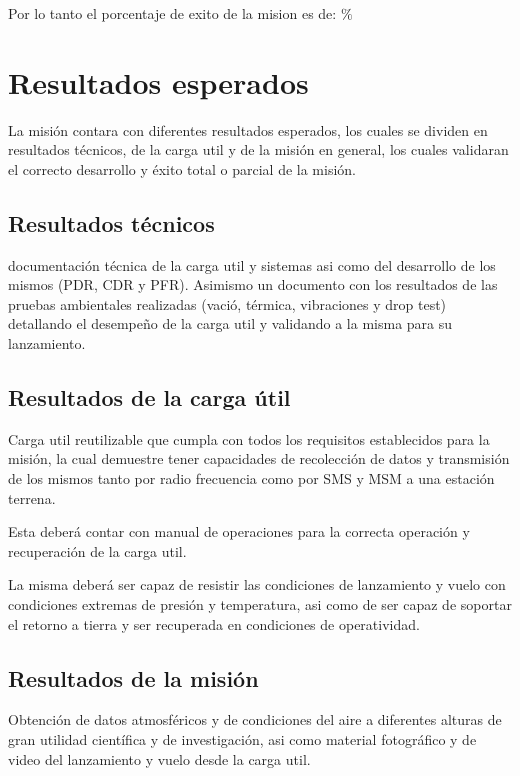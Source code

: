 \documentclass[letterpaper,12pt]{article} %
\begin{document}
    Por lo tanto el porcentaje de exito de la mision es de: $\%$

    \newpage

\section{Resultados esperados}

    La misión contara con diferentes resultados esperados, los cuales se dividen en resultados técnicos, de la carga util y de la misión en general, 
    los cuales validaran el correcto desarrollo y éxito total o parcial de la misión.

    \subsection{Resultados técnicos}

    documentación técnica de la carga util y sistemas asi como del desarrollo de los mismos
    (PDR, CDR y PFR).
    Asimismo un documento con los resultados de las pruebas ambientales realizadas (vació, térmica, vibraciones y drop test)
    detallando el desempeño de la carga util y validando a la misma para su lanzamiento. 

    \subsection{Resultados de la carga útil}

    Carga util reutilizable que cumpla con todos los requisitos establecidos para la misión, la cual
    demuestre tener capacidades de recolección de datos y transmisión de los mismos tanto por radio
    frecuencia como por SMS y MSM a una estación terrena.
    
    Esta deberá contar con manual de operaciones 
    para la correcta operación y recuperación de la carga util.
    
    La misma deberá ser capaz de resistir las condiciones de lanzamiento y vuelo con condiciones extremas de presión y temperatura,
    asi como de ser capaz de soportar el retorno a tierra y ser recuperada en condiciones de operatividad.


    \subsection{Resultados de la misión}

    Obtención de datos atmosféricos y de condiciones del aire a diferentes alturas de gran utilidad
    científica y de investigación, asi como material fotográfico y de video del lanzamiento y vuelo desde la carga util.
    
\end{document}
